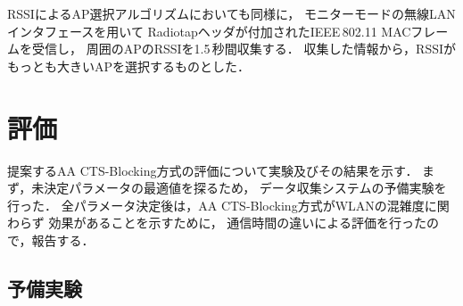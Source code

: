 \documentclass[technicalreport]{ieicej}
\begin{document}
RSSIによるAP選択アルゴリズムにおいても同様に，
モニターモードの無線LANインタフェースを用いて
Radiotapヘッダが付加されたIEEE\,802.11 MACフレームを受信し，
周囲のAPのRSSIを1.5\,秒間収集する．
収集した情報から，RSSIがもっとも大きいAPを選択するものとした．



\section{評価}
\label{sec:eval}

提案するAA CTS-Blocking方式の評価について実験及びその結果を示す．
まず，未決定パラメータの最適値を探るため，
データ収集システムの予備実験を行った．
全パラメータ決定後は，AA CTS-Blocking方式がWLANの混雑度に関わらず
効果があることを示すために，
通信時間の違いによる評価を行ったので，報告する．


\subsection{予備実験}
\label{ssec:before_exp}
\end{document}
